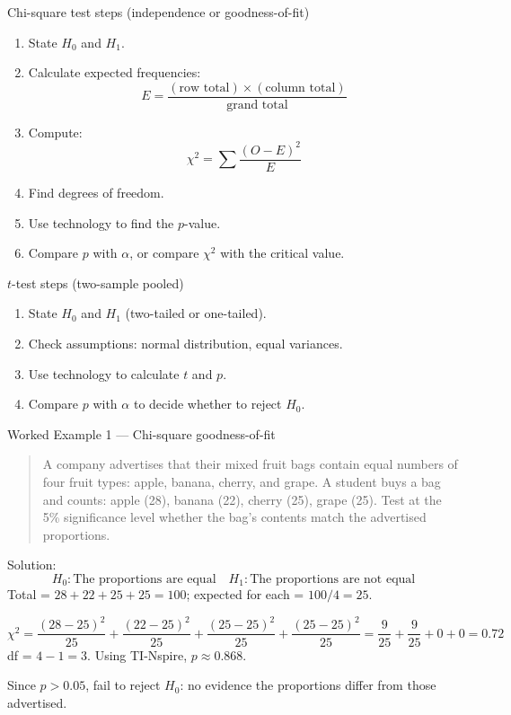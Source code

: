 \documentclass[11pt]{article}
\def\textbf#1{#1}%
\begin{document}
\textbf{Chi-square test steps (independence or goodness-of-fit)}
\begin{enumerate}
    \item State $H_0$ and $H_1$.
    \item Calculate expected frequencies:
    \[
    E = \frac{(\text{row total}) \times (\text{column total})}{\text{grand total}}
    \]
    \item Compute:
    \[
    \chi^2 = \sum \frac{(O - E)^2}{E}
    \]
    \item Find degrees of freedom.
    \item Use technology to find the $p$-value.
    \item Compare $p$ with $\alpha$, or compare $\chi^2$ with the critical value.
\end{enumerate}

\textbf{$t$-test steps (two-sample pooled)}
\begin{enumerate}
    \item State $H_0$ and $H_1$ (two-tailed or one-tailed).
    \item Check assumptions: normal distribution, equal variances.
    \item Use technology to calculate $t$ and $p$.
    \item Compare $p$ with $\alpha$ to decide whether to reject $H_0$.
\end{enumerate}

\textbf{Worked Example 1 — Chi-square goodness-of-fit}
\begin{quote}
A company advertises that their mixed fruit bags contain equal numbers of four fruit types: apple, banana, cherry, and grape. A student buys a bag and counts: apple (28), banana (22), cherry (25), grape (25).  
Test at the 5\% significance level whether the bag's contents match the advertised proportions.
\end{quote}

\textbf{Solution:}
\[
H_0: \text{The proportions are equal} \quad H_1: \text{The proportions are not equal}
\]
Total = $28+22+25+25=100$; expected for each = $100/4=25$.

\[
\chi^2 = \frac{(28-25)^2}{25} + \frac{(22-25)^2}{25} + \frac{(25-25)^2}{25} + \frac{(25-25)^2}{25}
= \frac{9}{25} + \frac{9}{25} + 0 + 0 = 0.72
\]
df = $4-1=3$.  
Using TI-Nspire, $p \approx 0.868$.

Since $p > 0.05$, fail to reject $H_0$: no evidence the proportions differ from those advertised.
\end{document}

